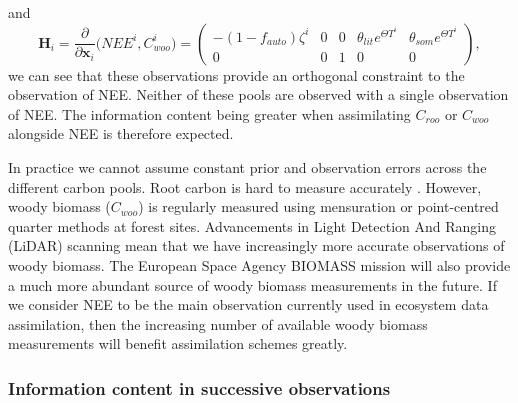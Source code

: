 \documentclass[11pt]{article}
\begin{document}
and
\begin{equation}
\textbf{H}_{i} = \frac{\partial}{\partial \textbf{x}_{i}}\big(NEE^{i}, C_{woo}^{i} \big) =
 \begin{pmatrix}
-(1-f_{auto})\zeta^i & 0 & 0 & \theta_{lit} e^{\Theta T^{i}} & \theta_{som} e^{\Theta T^{i}}\\
0 & 0 & 1 & 0 & 0
\end{pmatrix},
\end{equation}
we can see that these observations provide an orthogonal constraint to the observation of NEE. Neither of these pools are observed with a single observation of NEE. The information content being greater when assimilating \(C_{roo}\) or \(C_{woo}\) alongside NEE is therefore expected. 

In practice we cannot assume constant prior and observation errors across the different carbon pools. Root carbon is hard to measure accurately \citep{brown2002measuring}. However, woody biomass (\(C_{woo}\)) is regularly measured using mensuration \citep{husch2002forest} or point-centred quarter methods \citep{dahdouh2006empirical} at forest sites. Advancements in Light Detection And Ranging (LiDAR) scanning \citep{Lefsky199983} mean that we have increasingly more accurate observations of woody biomass. The European Space Agency BIOMASS mission \citep{le2011biomass} will also provide a much more abundant source of woody biomass measurements in the future. If we consider NEE to be the main observation currently used in ecosystem data assimilation, then the increasing number of available woody biomass measurements will benefit assimilation schemes greatly.

\subsubsection{Information content in successive observations} \label{sec:D1_succ_obs}
\end{document}
